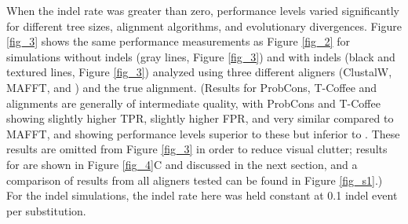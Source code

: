 When the indel rate was greater than zero, performance levels varied
significantly for different tree sizes, alignment algorithms, and
evolutionary divergences. Figure \ref{fig_3} shows the same
performance measurements as Figure \ref{fig_2} for simulations without
indels (gray lines, Figure \ref{fig_3}) and with indels (black and
textured lines, Figure \ref{fig_3}) analyzed using three different
aligners (ClustalW, MAFFT, and \prankc) and the true
alignment. (Results for ProbCons, T-Coffee and \pranka alignments are
generally of intermediate quality, with ProbCons and T-Coffee showing
slightly higher TPR, slightly higher FPR, and very similar \tpr{}
compared to MAFFT, and \pranka showing performance levels superior to
these but inferior to \prankc. These results are omitted from Figure
\ref{fig_3} in order to reduce visual clutter; \tpr results for
\pranka are shown in Figure \ref{fig_4}C and discussed in the next
section, and a comparison of results from all aligners tested can be
found in Figure \ref{fig_s1}.) For the indel simulations, the indel
rate here was held constant at 0.1 indel event per substitution.

